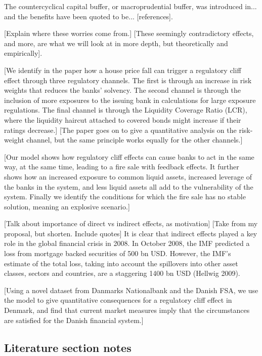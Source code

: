 \documentclass[11pt]{article}
\begin{document}
\begin{appendices}
The countercyclical capital buffer, or macroprudential buffer, was introduced in... and the benefits have been quoted to be... [references]. 

[Explain where these worries come from.] [These seemingly contradictory effects, and more, are what we will look at in more depth, but theoretically and empirically]. 


[We identify in the paper how a house price fall can trigger a regulatory cliff effect through three regulatory channels. The first is through an increase in risk weights that reduces the banks' solvency. The second channel is through the inclusion of more exposures to the issuing bank in calculations for large exposure regulations. The final channel is through the Liquidity Coverage Ratio (LCR), where the liquidity haircut attached to covered bonds might increase if their ratings decrease.] [The paper goes on to give a quantitative analysis on the risk-weight channel, but the same principle works equally for the other channels.]

[Our model shows how regulatory cliff effects can cause banks to act in the same way, at the same time, leading to a fire sale with feedback effects. It further shows how an increased exposure to common liquid assets, increased leverage of the banks in the system, and less liquid assets all add to the vulnerability of the system. Finally we identify the conditions for which the fire sale has no stable solution, meaning an explosive scenario.]

[Talk about importance of direct vs indirect effects, as motivation]
[Take from my proposal, but shorten. Include quotes]
It is clear that indirect effects played a key role in the global financial crisis in 2008. In October 2008, the IMF predicted a loss from mortgage backed securities of 500 bn USD. However, the IMF’s estimate of the total loss, taking into account the spillovers into other asset classes, sectors and countries, are a staggering 1400 bn USD (Hellwig 2009).

[Using a novel dataset from Danmarks Nationalbank and the Danish FSA, we use the model to give quantitative consequences for a regulatory cliff effect in Denmark, and find that current market measures imply that the circumstances are satisfied for the Danish financial system.]

\subsection*{Literature section notes}


\end{appendices}
\end{document}
